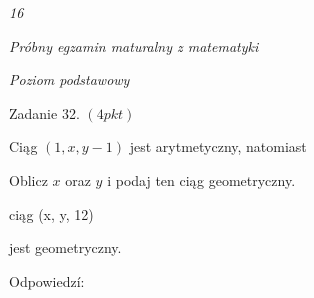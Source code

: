 \documentclass[a4paper,12pt]{article}
\begin{document}
{\it 16}

{\it Próbny egzamin maturalny z matematyki}

{\it Poziom podstawowy}

Zadanie 32. $(4pkt)$

Ciąg $(1,x,y-1)$ jest arytmetyczny, natomiast

Oblicz $x$ oraz $y$ i podaj ten ciąg geometryczny.

ciąg (x, y, 12)

jest geometryczny.

Odpowiedzí:
\end{document}
